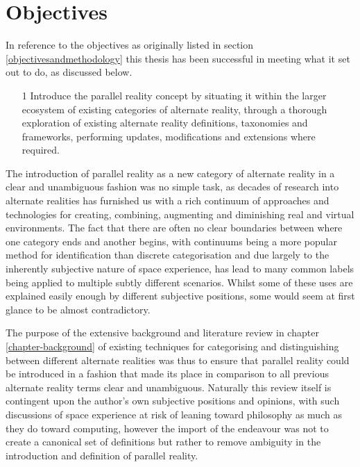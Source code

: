 
\section{Objectives}

In reference to the objectives as originally listed in section \ref{objectivesandmethodology} this thesis has been successful in meeting what it set out to do, as discussed below.

\begin{enumerate}
	\item[1] Introduce the parallel reality concept by situating it within the larger ecosystem of existing categories of alternate reality, through a thorough exploration of existing alternate reality definitions, taxonomies and frameworks, performing updates, modifications and extensions where required.
\end{enumerate}

The introduction of parallel reality as a new category of alternate reality in a clear and unambiguous fashion was no simple task, as decades of research into alternate realities has furnished us with a rich continuum of approaches and technologies for creating, combining, augmenting and diminishing real and virtual environments. The fact that there are often no clear boundaries between where one category ends and another begins, with continuums being a more popular method for identification than discrete categorisation and due largely to the inherently subjective nature of space experience, has lead to many common labels being applied to multiple subtly different scenarios. Whilst some of these uses are explained easily enough by different subjective positions, some would seem at first glance to be almost contradictory.

The purpose of the extensive background and literature review in chapter \ref{chapter-background} of existing techniques for categorising and distinguishing between different alternate realities was thus to ensure that parallel reality could be introduced in a fashion that made its place in comparison to all previous alternate reality terms clear and unambiguous. Naturally this review itself is contingent upon the author's own subjective positions and opinions, with such discussions of space experience at risk of leaning toward philosophy as much as they do toward computing, however the import of the endeavour was not to create a canonical set of definitions but rather to remove ambiguity in the introduction and definition of parallel reality.

